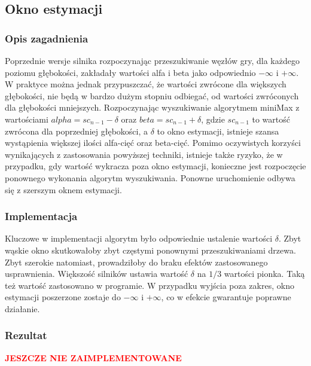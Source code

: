 \subsection{Okno estymacji}
\label{subsec:okno-estymacji}

\subsubsection{Opis zagadnienia}
Poprzednie wersje silnika rozpoczynając przeszukiwanie węzłów gry, dla każdego poziomu głębokości, zakładały wartości alfa i beta jako odpowiednio $-\infty$ i $+\infty$.
W praktyce można jednak przypuszczać, że wartości zwrócone dla większych głębokości, nie będą w bardzo dużym stopniu odbiegać, od wartości zwróconych dla głębokości mniejszych.
Rozpoczynając wyszukiwanie algorytmem miniMax z wartościami $alpha = sc_{n-1} - \delta$ oraz $beta = sc_{n-1} + \delta$, gdzie $sc_{n-1}$ to wartość zwrócona dla poprzedniej głębokości, a $\delta$ to okno estymacji, istnieje szansa wystąpienia większej ilości alfa-cięć oraz beta-cięć.
Pomimo oczywistych korzyści wynikających z zastosowania powyższej techniki, istnieje także ryzyko, że w przypadku, gdy wartość wykracza poza okno estymacji, konieczne jest rozpoczęcie ponownego wykonania algorytm wyszukiwania.
Ponowne uruchomienie odbywa się z szerszym oknem estymacji.

\subsubsection{Implementacja}
Kluczowe w implementacji algorytm było odpowiednie ustalenie wartości $\delta$.
Zbyt wąskie okno skutkowałoby zbyt częstymi ponownymi przeszukiwaniami drzewa.
Zbyt szerokie natomiast, prowadziłoby do braku efektów zastosowanego usprawnienia.
Większość silników ustawia wartość $\delta$ na $1/3$ wartości pionka. \cite*{duch}
Taką też wartość zastosowano w programie.
W przypadku wyjścia poza zakres, okno estymacji poszerzone zostaje do $-\infty$ i $+\infty$, co w efekcie gwarantuje poprawne działanie.

\subsubsection{Rezultat}
\begin{center}
    \textcolor{red}{\textbf{JESZCZE NIE ZAIMPLEMENTOWANE}}
\end{center}
